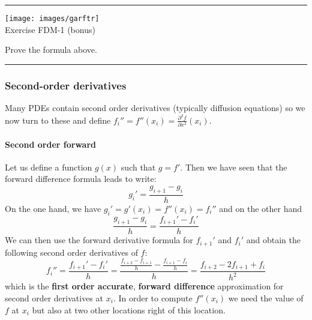 \begin{center}
\begin{minipage}[t]{0.77\textwidth}
\par\noindent\rule{\textwidth}{0.4pt}

\begin{center}
\texttt{[image: images/garftr]} \\
{\color{orange}Exercise FDM-1 (bonus)}
\end{center}

Prove the formula above.

\par\noindent\rule{\textwidth}{0.4pt}
\end{minipage}
\end{center}





\subsubsection{Second-order derivatives}

Many PDEs contain second order derivatives (typically diffusion equations)
so we now turn to these and 
define $f_i''=f''(x_i) = \frac{\partial^2 f}{\partial x^2} (x_i)$. 

\paragraph{Second order forward} 
Let us define a function $g(x)$ such that $g=f'$. Then we have seen that the forward 
difference formula leads to write: 
\begin{equation}
g_i' = \frac{g_{i+1}-g_{i}}{h}
\end{equation}
On the one hand, we have $g_i'=g'(x_i)=f''(x_i)=f_i''$ and on the other hand
\begin{equation}
\frac{g_{i+1}-g_{i}}{h} = \frac{f_{i+1}'-f_{i}'}{h}
\end{equation}
We can then use the forward derivative formula for $f_{i+1}'$ and $f_{i}'$ and 
obtain the following second order derivatives of $f$:
\begin{equation}
f_{i}'' 
= \frac{f_{i+1}'-f_i'}{h} 
= \frac{\frac{f_{i+2}-f_{i+1}}{h}-
\frac{f_{i+1}-f_i}{h}
}{h} 
= \frac{f_{i+2}-2f_{i+1}+f_i}{h^2} 
\end{equation}
which is the {\bf first order accurate}, {\bf forward difference} approximation for
second order derivatives at $x_{i}$.
In order to compute $f''(x_i)$ we need the value of $f$ at $x_i$ but also at two 
other locations right of this location.

